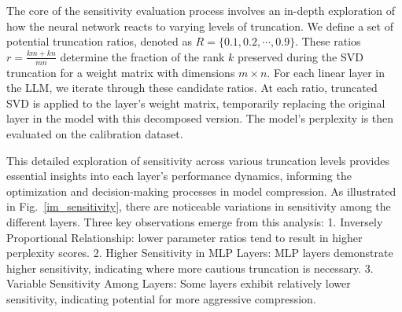 


The core of the sensitivity evaluation process involves an in-depth exploration of how the neural network reacts to varying levels of truncation. We define a set of potential truncation ratios, denoted as $R=\{0.1, 0.2, \cdots, 0.9\}$. These ratios $r=\frac{km+kn}{mn}$ determine the fraction of the rank $k$ preserved during the SVD truncation for a weight matrix with dimensions $m\times n$. 
For each linear layer in the LLM, we iterate through these candidate ratios. At each ratio, truncated SVD is applied to the layer's weight matrix, temporarily replacing the original layer in the model with this decomposed version. The model's perplexity is then evaluated on the calibration dataset.



This detailed exploration of sensitivity across various truncation levels provides essential insights into each layer's performance dynamics, informing the optimization and decision-making processes in model compression. As illustrated in Fig.~\ref{im_sensitivity}, there are noticeable variations in sensitivity among the different layers. Three key observations emerge from this analysis: 
1. Inversely Proportional Relationship: lower parameter ratios tend to result in higher perplexity scores. 
2. Higher Sensitivity in MLP Layers: MLP layers demonstrate higher sensitivity, indicating where more cautious truncation is necessary.
3. Variable Sensitivity Among Layers: Some layers exhibit relatively lower sensitivity, indicating potential for more aggressive compression. 

